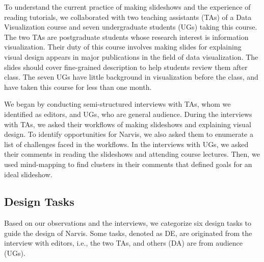 To understand the current practice of making slideshows and the experience of reading tutorials, we collaborated with two teaching assistants (TAs) of a Data Visualization course and seven undergraduate students (UGs) taking this course. The two TAs are postgraduate students whose research interest is information visualization. Their duty of this course involves making slides for explaining visual design appears in major publications in the field of data visualization. The slides should cover fine-grained description to help students review them after class. The seven UGs have little background in visualization before the class, and have taken this course for less than one month.  

We began by conducting semi-structured interviews with TAs, whom we identified as editors, and UGs, who are general audience. During the interviews with TAs, we asked their workflows of making slideshows and explaining visual design. To identify opportunities for Narvis, we also asked them to enumerate a list of challenges faced in the workflows. In the interviews with UGs, we asked their comments in reading the slideshows and attending course lectures. Then, we used mind-mapping to find clusters in their comments that defined goals for an ideal slideshow. 






\subsection{Design Tasks}
Based on our observations and the interviews, we categorize six design tasks to guide the design of Narvis. Some tasks, denoted as DE, are originated from the interview with editors, i.e., the two TAs, and others (DA) are from audience (UGs).

